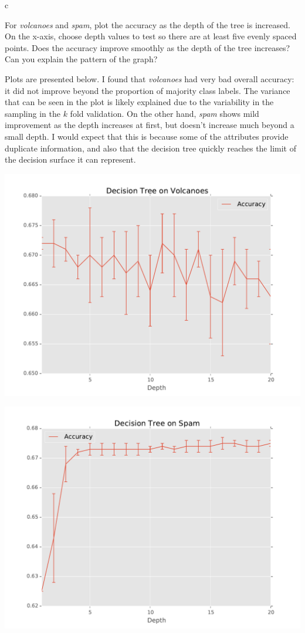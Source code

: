 \documentclass[fleqn]{homework}
\begin{document}
  \begin{problem}{c}
    \begin{question}
      For \textit{volcanoes} and \textit{spam}, plot the accuracy as the depth
      of the tree is increased. On the x-axis, choose depth values to test so
      there are at least five evenly spaced points. Does the accuracy improve
      smoothly as the depth of the tree increases? Can you explain the pattern
      of the graph?
    \end{question}
    
    Plots are presented below.  I found that \textit{volcanoes} had very bad
    overall accuracy: it did not improve beyond the proportion of majority class
    labels.  The variance that can be seen in the plot is likely explained due
    to the variability in the sampling in the $k$ fold validation.  On the other
    hand, \textit{spam} shows mild improvement as the depth increases at first,
    but doesn't increase much beyond a small depth.  I would expect that this is
    because some of the attributes provide duplicate information, and also that
    the decision tree quickly reaches the limit of the decision surface it can
    represent.

    \includegraphics[width=0.48\textheight]{volcanoes.pdf}

    \includegraphics[width=0.48\textheight]{spam.pdf}
  \end{problem}
\end{document}
